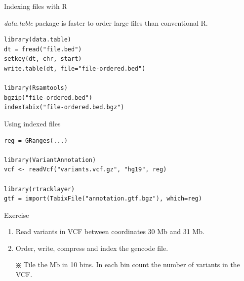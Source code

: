\documentclass[10pt]{beamer}
\begin{document}
\begin{frame}[fragile]{Indexing files with R}
  \begin{block}{}
    {\it data.table} package is faster to order large files than conventional R.
  \end{block}
  \bigskip
  \begin{block}{}
  \begin{lstlisting}
library(data.table)
dt = fread("file.bed")
setkey(dt, chr, start)
write.table(dt, file="file-ordered.bed")

library(Rsamtools)
bgzip("file-ordered.bed")
indexTabix("file-ordered.bed.bgz")
  \end{lstlisting}
  \end{block}
\end{frame}

\begin{frame}[fragile]{Using indexed files}
  \begin{block}{}
  \begin{lstlisting}
reg = GRanges(...)

library(VariantAnnotation)
vcf <- readVcf("variants.vcf.gz", "hg19", reg)

library(rtracklayer)
gtf = import(TabixFile("annotation.gtf.bgz"), which=reg)
  \end{lstlisting}
  \end{block}
  \bigskip
  \begin{alertblock}{Exercise}
  \begin{enumerate}
  \item Read variants in VCF between coordinates 30 Mb and 31 Mb.
  \item Order, write, compress and index the gencode file.
  \item[$\divideontimes$] Tile the Mb in 10 bins. In each bin count the number of variants in the VCF.
  \end{enumerate}
  \end{alertblock}
\end{frame}
\end{document}
